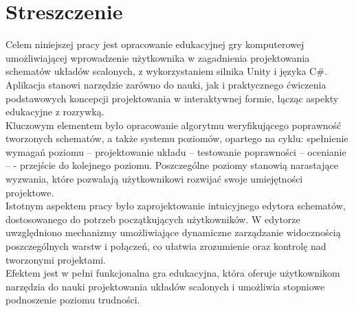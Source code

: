 \section*{Streszczenie}
\label{sec:streszczenie}
\thispagestyle{plain}
Celem niniejszej pracy jest opracowanie edukacyjnej gry komputerowej umożliwiającej wprowadzenie użytkownika
w zagadnienia projektowania schematów układów scalonych,
z wykorzystaniem silnika Unity i języka C\#.
Aplikacja stanowi narzędzie zarówno do nauki,
jak i praktycznego ćwiczenia podstawowych koncepcji projektowania w interaktywnej formie,
łącząc aspekty edukacyjne z rozrywką.\\
\indent %
Kluczowym elementem było opracowanie algorytmu weryfikującego
poprawność tworzonych schematów,
a także systemu poziomów,
opartego na cyklu: spełnienie wymagań poziomu – projektowanie układu – testowanie poprawności – ocenianie – \linebreak
- przejście
do kolejnego poziomu.
Poszczególne poziomy stanowią narastające wyzwania,
które pozwalają użytkownikowi rozwijać swoje umiejętności projektowe.\\
\indent Istotnym aspektem pracy było zaprojektowanie intuicyjnego edytora schema\-tów,
dostosowanego do potrzeb początkujących użytkowników.
W edytorze uwzględniono mechanizmy umożliwiające dynamiczne zarządzanie widocznością poszczególnych warstw i połączeń,
co ułatwia zrozumienie oraz kontrolę nad tworzonymi projektami.\\
\indent Efektem jest w pełni funkcjonalna gra edukacyjna,
która oferuje użytkownikom narzędzia do nauki projektowania układów scalonych
i umożliwia stopniowe podnoszenie poziomu trudności.
